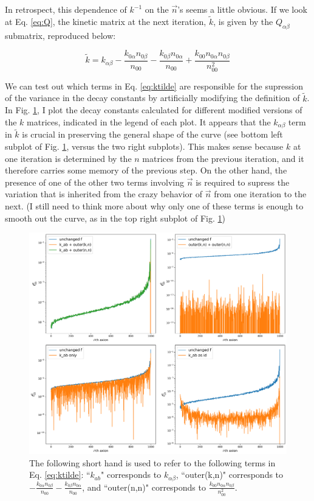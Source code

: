 \documentclass[11pt]{article}
\begin{document}
In retrospect, this dependence of $k^{-1}$ on the $\vec{n}$'s seems a little obvious. If we look at Eq. \eqref{eq:Q}, the kinetic matrix at the next iteration, $\tilde{k}$, is given by the $Q_{\alpha\beta}$ submatrix, reproduced below:

\begin{equation}
    \label{eq:ktilde}
    \tilde{k} = k_{\alpha\beta} - \frac{k_{0\alpha}n_{0\beta}}{n_{00}} - \frac{k_{0\beta}n_{0\alpha}}{n_{00}} + \frac{k_{00} n_{0\alpha}n_{0\beta}}{n_{00}^2}
\end{equation}

We can test out which terms in Eq. \eqref{eq:ktilde} are responsible for the supression of the variance in the decay constants by artificially modifying the definition of $\tilde{k}$. In Fig. \ref{fig:fs-modifying-k}, I plot the decay constants calculated for different modified versions of the $k$ matrices, indicated in the legend of each plot. It appears that the $k_{\alpha\beta}$ term in $\tilde{k}$ is crucial in preserving the general shape of the curve (see bottom left subplot of Fig. \ref{fig:fs-modifying-k}, versus the two right subplots). This makes sense because $k$ at one iteration is determined by the $n$ matrices from the previous iteration, and it therefore carries some memory of the previous step. On the other hand, the presence of one of the other two terms involving $\vec{n}$ is required to supress the variation that is inherited from the crazy behavior of $\vec{n}$ from one iteration to the next. (I still need to think more about why only one of these terms is enough to smooth out the curve, as in the top right subplot of Fig. \ref{fig:fs-modifying-k})

\begin{figure}[h]
    \centering
    \includegraphics[width=0.95\linewidth]{figs/f_comparisons.png}
    \caption{The following short hand is used to refer to the following terms in Eq. \eqref{eq:ktilde}: ``$k_{ab}$" corresponds to $k_{\alpha\beta}$, ``outer(k,n)" corresponds to $- \frac{k_{0\alpha}n_{0\beta}}{n_{00}} - \frac{k_{0\beta}n_{0\alpha}}{n_{00}} $, and ``outer(n,n)" corresponds to $\frac{k_{00} n_{0\alpha}n_{0\beta}}{n_{00}^2}$.}
    \label{fig:fs-modifying-k}
\end{figure}
\end{document}
